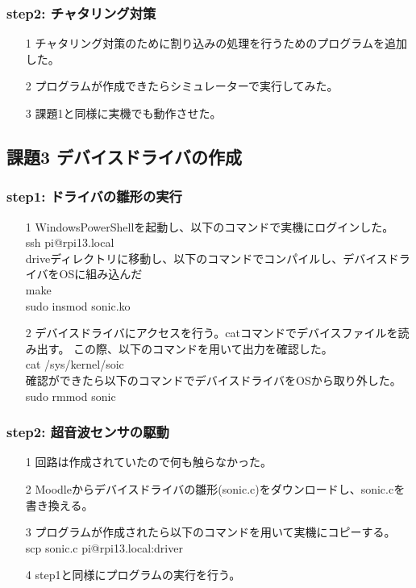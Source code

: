 \documentclass[dvipdfmx]{jsarticle}
\begin{document}
\subsubsection{step2: チャタリング対策}
\begin{itemize}
  \item[1] チャタリング対策のために割り込みの処理を行うためのプログラムを追加した。
  \item[2] プログラムが作成できたらシミュレーターで実行してみた。
  \item[3] 課題1と同様に実機でも動作させた。 
\end{itemize}

\subsection{課題3 デバイスドライバの作成}
\subsubsection{step1: ドライバの雛形の実行}
\begin{itemize}
  \item[1] WindowsPowerShellを起動し、以下のコマンドで実機にログインした。\\
  ssh pi@rpi13.local\\
  driveディレクトリに移動し、以下のコマンドでコンパイルし、デバイスドライバをOSに組み込んだ\\
  make\\
  sudo insmod sonic.ko
  \item[2] デバイスドライバにアクセスを行う。catコマンドでデバイスファイルを読み出す。
  この際、以下のコマンドを用いて出力を確認した。\\
  cat /sys/kernel/soic\\
  確認ができたら以下のコマンドでデバイスドライバをOSから取り外した。\\
  sudo rmmod sonic\\
\end{itemize}

\subsubsection{step2: 超音波センサの駆動}
\begin{itemize}
  \item[1] 回路は作成されていたので何も触らなかった。
  \item[2] Moodleからデバイスドライバの雛形(sonic.c)をダウンロードし、sonic.cを書き換える。
  \item[3] プログラムが作成されたら以下のコマンドを用いて実機にコピーする。\\
  scp sonic.c pi@rpi13.local:driver
  \item[4] step1と同様にプログラムの実行を行う。
\end{itemize}
\end{document}
